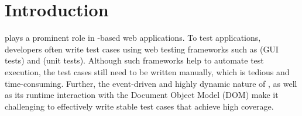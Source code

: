 \section{Introduction} \label{Sec:intro}
\javascript plays a prominent role in \javascript-based web applications. To test \javascript applications, developers often write test cases using web testing frameworks such as \selenium (GUI tests) and \qunit (\javascript unit tests). Although such frameworks help to automate test execution, the test cases still need to be written manually, which is tedious and time-consuming. 
Further, the event-driven and highly dynamic nature of \javascript, as well as its runtime interaction with the Document Object Model (DOM) make it challenging to effectively write stable test cases that achieve high coverage. %
%
%
%

